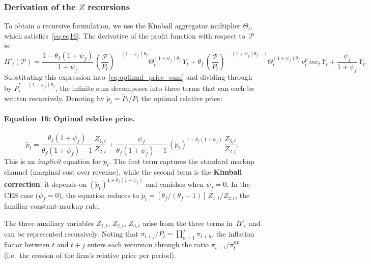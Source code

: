 \documentclass[11pt,a4paper]{article}
\begin{document}
\subsubsection{Derivation of the $Z$ recursions}

To obtain a recursive formulation, we use the Kimball aggregator
multiplier $\Theta_t$, which satisfies~\eqref{eq:eq16}. The derivative
of the profit function with respect to~$\mathcal{P}$ is:
\[
  \Pi'_t(\mathcal{P}) =
  \frac{1-\theta_f(1+\psi_f)}{1+\psi_f}\,
  \left(\frac{\mathcal{P}}{P_t}\right)^{\!-(1+\psi_f)\theta_f}\!
  \Theta_t^{(1+\psi_f)\theta_f}\,Y_t
  + \theta_f\,
  \left(\frac{\mathcal{P}}{P_t}\right)^{\!-(1+\psi_f)\theta_f-1}\!
  \Theta_t^{(1+\psi_f)\theta_f}\,\nu^p_t\,mc_t\,Y_t
  + \frac{\psi_f}{1+\psi_f}\,Y_t.
\]
Substituting this expression into~\eqref{eq:optimal_price_sum} and
dividing through by $P_t^{*\,-(1+\psi_f)\theta_f}$, the infinite sum
decomposes into three terms that can each be written recursively. Denoting
by $\breve p_t = \breve P_t/P_t$ the optimal relative price:

\paragraph{Equation~15: Optimal relative price.}
\begin{equation}\label{eq:eq15}\tag{Eq.~15}
  \boxed{
  \breve p_t = \frac{\theta_f(1+\psi_f)}{\theta_f(1+\psi_f)-1}\,
  \frac{Z_{1,t}}{Z_{2,t}}
  + \frac{\psi_f}{\theta_f(1+\psi_f)-1}\,
  (\breve p_t)^{1+\theta_f(1+\psi_f)}\,
  \frac{Z_{3,t}}{Z_{2,t}}.}
\end{equation}
This is an \emph{implicit} equation for $\breve p_t$. The first term captures
the standard markup channel (marginal cost over revenue), while the
second term is the \textbf{Kimball correction}: it depends on
$(\breve p_t)^{1+\theta_f(1+\psi_f)}$ and vanishes when $\psi_f = 0$. In the
CES case ($\psi_f = 0$), the equation reduces to
$\breve p_t = [\theta_f/(\theta_f - 1)]\,Z_{1,t}/Z_{2,t}$, the familiar
constant-markup rule.

The three auxiliary variables $Z_{1,t}$, $Z_{2,t}$, $Z_{3,t}$ arise from
the three terms in~$\Pi'_t$ and can be represented recursively. Noting
that $\pi_{t+j}/P_t = \prod_{h=1}^{j}\pi_{t+h}$, the inflation factor
between $t$ and $t+j$ enters each recursion through the ratio
$\pi_{t+1}/\pi^{np}_t$ (i.e.\ the erosion of the firm's relative price
per period).
\end{document}
